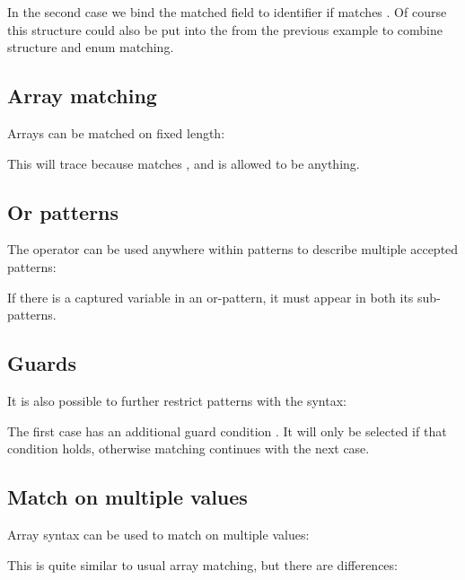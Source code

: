 In the second case we bind the matched  field to identifier  if  matches . Of course this structure could also be put into the  from the previous example to combine structure and enum matching.

\subsection{Array matching}
\label{lf-pattern-matching-array}

Arrays can be matched on fixed length:


This will trace  because  matches , and  is allowed to be anything.

\subsection{Or patterns}
\label{lf-pattern-matching-or}

The \expr{|} operator can be used anywhere within patterns to describe multiple accepted patterns:


If there is a captured variable in an or-pattern, it must appear in both its sub-patterns.

\subsection{Guards}
\label{lf-pattern-matching-guards}

It is also possible to further restrict patterns with the  syntax:


The first case has an additional guard condition . It will only be selected if that condition holds, otherwise matching continues with the next case.

\subsection{Match on multiple values}
\label{lf-pattern-matching-tuples}

Array syntax can be used to match on multiple values:


This is quite similar to usual array matching, but there are differences:

